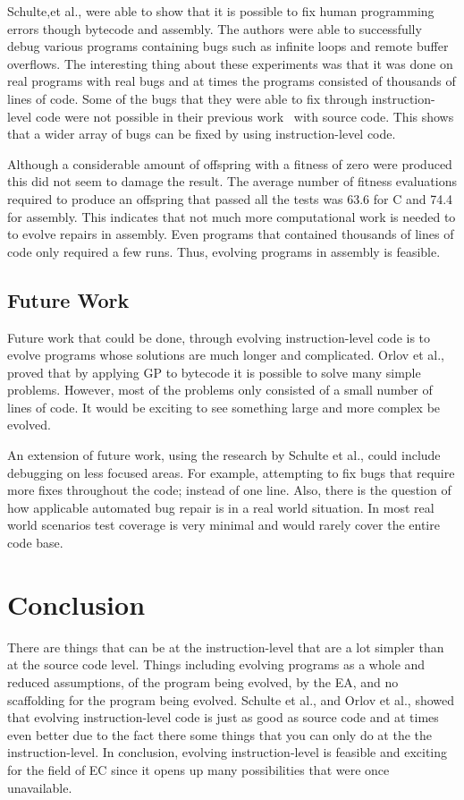 \documentclass{sig-alternate}
\begin{document}
Schulte,et al., were able to show that it is possible to fix human programming errors though bytecode and assembly. The authors were able to successfully debug various programs containing bugs such as infinite loops and remote buffer overflows. The interesting thing about these experiments was that it was done on real programs with real bugs and at times the programs consisted of thousands of lines of code. Some of the bugs that they were able to fix through instruction-level code were not possible in their previous work~\cite{Forrest:2009} with source code. This shows that a wider array of bugs can be fixed by using instruction-level code.

Although a considerable amount of offspring with a fitness of zero were produced this did not seem to damage the result. The average number of fitness evaluations required to produce an offspring that passed all the tests was 63.6 for C and 74.4 for assembly. This indicates that not much more computational work is needed to to evolve repairs in assembly. Even programs that contained thousands of lines of code only required a few runs. Thus, evolving programs in assembly is feasible.
 

\subsection{Future Work}


Future work that could be done, through evolving instruction-level code is to evolve programs whose solutions are much longer and complicated. Orlov et al.,~\cite{FINCH:2011} proved that by applying GP to bytecode it is possible to solve many simple problems. However, most of the problems only consisted of a small number of lines of code. It would be exciting to see something large and more complex be evolved.

An extension of future work, using the research by Schulte et al., could include debugging on less focused areas. For example, attempting to fix bugs that require more fixes throughout the code; instead of one line. Also, there is the question of how applicable automated bug repair is in a real world situation. In most real world scenarios test coverage is very minimal and would rarely cover the entire code base.


\section{Conclusion}
There are things that can be at the instruction-level that are a lot simpler than at the source code level. Things including evolving programs as a whole and reduced assumptions, of the program being evolved, by the EA, and no scaffolding for the program being evolved. Schulte et al., and Orlov et al., showed that evolving instruction-level code is just as good as source code and at times even better due to the fact there some things that you can only do at the the instruction-level. In conclusion, evolving instruction-level is feasible and exciting for the field of EC since it opens up many possibilities that were once unavailable.
\end{document}
